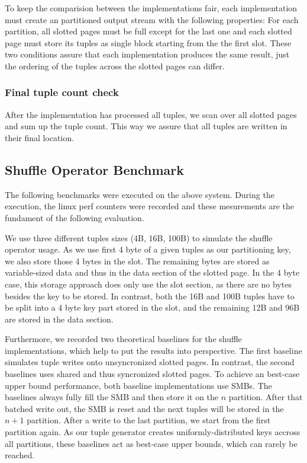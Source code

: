 To keep the comparision between the implementations fair, each implementation must create an partitioned output stream with the following properties: For each partition, all slotted pages must be full except for the last one and each slotted page must store its tuples as single block starting from the the first slot.
These two conditions assure that each implementation produces the same result, just the ordering of the tuples across the slotted pages can differ.
\subsubsection{Final tuple count check}
After the implementation has processed all tuples, we scan over all slotted pages and sum up the tuple count.
This way we assure that all tuples are written in their final location.

\subsection{Shuffle Operator Benchmark}
The following benchmarks were executed on the above system.
During the execution, the linux perf counters were recorded and these mesurements are the fundament of the following evaluation.

We use three different tuples sizes (4B, 16B, 100B) to simulate the shuffle operator usage.
As we use first 4 byte of a given tuples as our partitioning key, we also store those 4 bytes in the slot.
The remaining bytes are stored as variable-sized data and thus in the data section of the slotted page.
In the 4 byte case, this storage approach does only use the slot section, as there are no bytes besides the key to be stored.
In contrast, both the 16B and 100B tuples have to be split into a 4 byte key part stored in the slot, and the remaining 12B and 96B are stored in the data section.

Furthermore, we recorded two theoretical baselines for the shuffle implementations, which help to put the results into perspective.
The first baseline simulates tuple writes onto unsyncronized slotted pages.
In contrast, the second baselines uses shared and thus syncronized slotted pages.
To achieve an best-case upper bound performance, both baseline implementations use \acfp{SMB}.
The baselines always fully fill the \ac{SMB} and then store it on the $n$ partition.
After that batched write out, the \ac{SMB} is reset and the next tuples will be stored in the $n+1$ partition.
After a write to the last partition, we start from the first partition again.
As our tuple generator creates uniformly-distributed keys accross all partitions, these baselines act as best-case upper bounds, which can rarely be reached.

